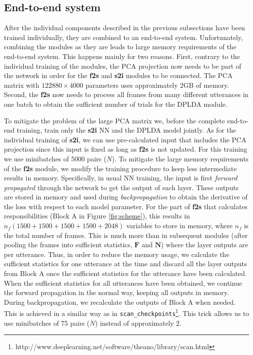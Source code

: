 \documentclass{article}
\begin{document}
\subsection{End-to-end system}
\label{subsec:e2e}
After the individual components described in the previous subsections have been trained individually, they are combined to an end-to-end system. 
Unfortunately, combining the modules as they are leads to large memory requirements of the end-to-end system. This happens mainly for two reasons. First, contrary to the individual training of the modules, the PCA projection now needs to be part of the network in order for the {\bf f2s} and {\bf s2i} modules to be connected. The PCA matrix with $122880\times4000$ parameters uses approximately 2GB of memory. Second, the {\bf f2s} now needs to process all frames from many different utterances in one batch to obtain the sufficient number of trials for the DPLDA module.

To mitigate the problem of the large PCA matrix we, before the complete end-to-end training, train only the {\bf s2i} NN and the DPLDA model jointly. As for the individual training of {\bf s2i}, we can use pre-calculated input that includes the PCA projection since this input is fixed as long as {\bf f2s} is not updated. For this training we use minibatches of 5000 pairs ($N$).
To mitigate the large memory requirements of the {\bf f2s} module, we modify the training procedure to keep less intermediate results in memory. Specifically, in usual NN training, the input is first \emph{forward propagated} through the network to get the output of each layer. These outputs are stored in memory and used during \emph{backpropagation} to obtain the derivative of the loss with respect to each model parameter. For the part of {\bf f2s} that calculates responsibilities (Block A in Figure \ref{fig:scheme}), this results in $n_f(1500+1500+1500+1500+2048)$ variables to store in memory, where $n_f$ is the total number of frames. This is much more than in subsequent modules (after pooling the frames into sufficient statistics, $\mathbf{F}$ and $\mathbf  {N}$) where the layer outputs are per utterance. Thus, in order to reduce the memory usage, we calculate the sufficient statistics for one utterance at the time and discard all the layer outputs from Block A once the sufficient statistics for the utterance have been calculated. When the sufficient statistics for all utterances have been obtained, we continue the forward propagation in the normal way, keeping all outputs in memory. During backpropagation, we recalculate the outputs of Block A when needed. This is achieved in a similar way as in \texttt{scan\_checkpoints}\footnote{http://www.deeplearning.net/software/theano/library/scan.html}. This trick allows us to use minibatches of 75 pairs ($N$) instead of approximately 2.  
\end{document}
